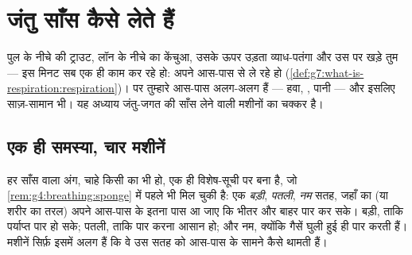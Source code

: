 \chapter{जंतु साँस कैसे लेते हैं}\label{ch:g7:how-animals-breathe}

पुल के नीचे की ट्राउट, लॉन के नीचे का केंचुआ, उसके ऊपर उड़ता व्याध-पतंगा
और उस पर खड़े तुम --- इस मिनट सब एक ही काम कर रहे हो: अपने आस-पास से
 ले रहे हो
(\cref{def:g7:what-is-respiration:respiration})। पर तुम्हारे आस-पास
अलग-अलग हैं --- हवा, , पानी --- और इसलिए साज़-सामान भी। यह अध्याय
जंतु-जगत की साँस लेने वाली मशीनों का चक्कर है।

\section{एक ही समस्या, चार मशीनें}

\begin{proposition}[साझी विशेष-सूची]\label{prop:g7:how-animals-breathe:spec}
हर साँस वाला अंग, चाहे किसी का भी हो, एक ही विशेष-सूची पर बना है, जो
\cref{rem:g4:breathing:sponge} में पहले भी मिल चुकी है: एक
\emph{बड़ी}, \emph{पतली}, \emph{नम} सतह, जहाँ  का  (या शरीर का
तरल) अपने आस-पास के इतना पास आ जाए कि  भीतर और  बाहर पार कर सके। बड़ी, ताकि पर्याप्त पार हो सके; पतली, ताकि
पार करना आसान हो; और नम, क्योंकि गैसें घुली हुई ही पार करती हैं। मशीनें
सिर्फ़ इसमें अलग हैं कि वे उस सतह को आस-पास के सामने कैसे थामती हैं।
\end{proposition}
\admitted

